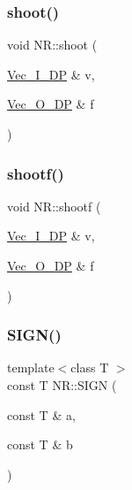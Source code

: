 \subsubsection{\texorpdfstring{shoot()}{shoot()}}
{\footnotesize\ttfamily void N\+R\+::shoot (\begin{DoxyParamCaption}\item[{\mbox{\hyperlink{namespaceNR_a9f943da53862537c552e2a770cb170ae}{Vec\+\_\+\+I\+\_\+\+DP}} \&}]{v,  }\item[{\mbox{\hyperlink{namespaceNR_a970094d23441f8ef6a45282a7eb2103d}{Vec\+\_\+\+O\+\_\+\+DP}} \&}]{f }\end{DoxyParamCaption})}

\mbox{\label{namespaceNR_a377b3f789f3b63d3472b288e5ee103cd}} 
\subsubsection{\texorpdfstring{shootf()}{shootf()}}
{\footnotesize\ttfamily void N\+R\+::shootf (\begin{DoxyParamCaption}\item[{\mbox{\hyperlink{namespaceNR_a9f943da53862537c552e2a770cb170ae}{Vec\+\_\+\+I\+\_\+\+DP}} \&}]{v,  }\item[{\mbox{\hyperlink{namespaceNR_a970094d23441f8ef6a45282a7eb2103d}{Vec\+\_\+\+O\+\_\+\+DP}} \&}]{f }\end{DoxyParamCaption})}

\mbox{\label{namespaceNR_a7d16d361ddfe7454271c3a0a8050ece2}} 
\subsubsection{\texorpdfstring{SIGN()}{SIGN()}\hspace{0.1cm}{\footnotesize\ttfamily [1/3]}}
{\footnotesize\ttfamily template$<$class T $>$ \\
const T N\+R\+::\+S\+I\+GN (\begin{DoxyParamCaption}\item[{const T \&}]{a,  }\item[{const T \&}]{b }\end{DoxyParamCaption})\hspace{0.3cm}{\ttfamily [inline]}}

\mbox{\label{namespaceNR_a5269afc715518376429b015036ff955c}} 
